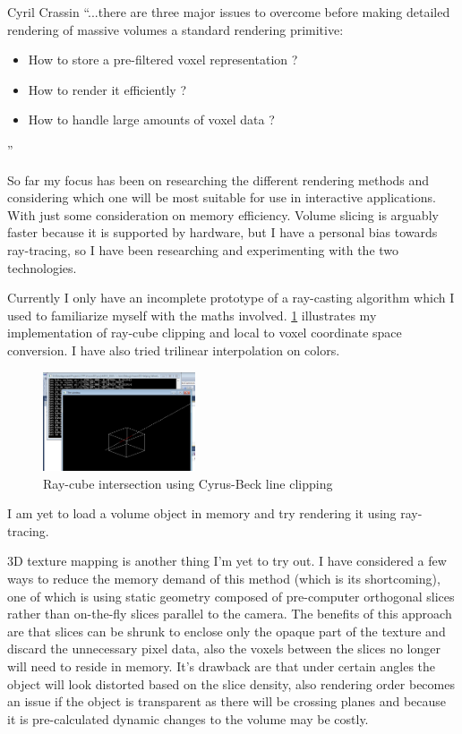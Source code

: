 \documentclass[11pt,fleqn,twoside]{article}
\begin{document}
\begin{aquote}{Cyril Crassin\cite{CCrassinThesis}}
	``...there are three major issues to overcome before making detailed rendering of massive volumes
	a standard rendering primitive:
	\begin{itemize}
		\item How to store a pre-filtered voxel representation ?
		\item How to render it efficiently ?
		\item How to handle large amounts of voxel data ?
	\end{itemize}''
\end{aquote}

So far my focus has been on researching the different rendering methods and considering which one will be most suitable for use in interactive applications. With just some consideration on memory efficiency. Volume slicing is arguably faster\cite{AlgorithmComparison} because it is supported by hardware, but I have a personal bias towards ray-tracing, so I have been researching and experimenting with the two technologies.

Currently I only have an incomplete prototype of a ray-casting algorithm which I used to familiarize myself with the maths involved. \ref{fig:rayCube} illustrates my implementation of ray-cube clipping and local to voxel coordinate space conversion. I have also tried trilinear interpolation on colors.
\begin{figure}[htb]
\centering
\includegraphics[width=0.4\textwidth]{ray-cube-intersection}
\caption{Ray-cube intersection using Cyrus-Beck line clipping}
\label{fig:rayCube}
\end{figure}

I am yet to load a volume object in memory and try rendering it using ray-tracing.

3D texture mapping is another thing I'm yet to try out. I have considered a few ways to reduce the memory demand of this method (which is its shortcoming), one of which is using static geometry composed of pre-computer orthogonal slices\cite{TextureMappingTut} rather than on-the-fly slices parallel to the camera. The benefits of this approach are that slices can be shrunk to enclose only the opaque part of the texture and discard the unnecessary pixel data, also the voxels between the slices no longer will need to reside in memory. It's drawback are that under certain angles the object will look distorted based on the slice density, also rendering order becomes an issue if the object is transparent as there will be crossing planes and because it is pre-calculated dynamic changes to the volume may be costly.
\end{document}
